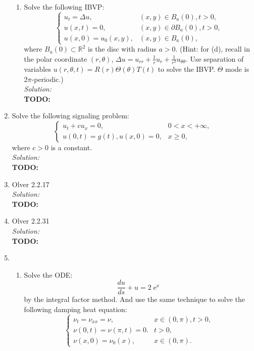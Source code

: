 \documentclass[10pt]{amsart}
\DeclareMathOperator{\E}{e}
\theoremstyle{nonumberplain}
\begin{document}
\begin{enumerate}[label={\bf {\arabic*}:}]
\begin{enumerate}
\item Solve the following IBVP:
$$
\begin{cases}
u_t = \Delta u, &(x, y) \in B_a(0), t> 0, \\
u(x, t) = 0, &(x, y) \in \partial B_a(0), t> 0, \\
u(x, 0) = u_0(x, y), &(x, y) \in B_a(0),
\end{cases}
$$
where $B_a(0) \subset \mathbb R^2$ is the disc with radius $a > 0$.
(Hint: for (d), recall in the polar coordinate $(r, \theta)$, $\Delta u = u_{rr} + \frac 1 r u_r + \frac 1 {r^2} u_{\theta\theta}$.
Use separation of variables $u(r, \theta, t) = R(r)\Theta(\theta)T(t)$ to solve the IBVP.
$\Theta$ mode is 2$\pi$-periodic.) \\

\noindent
\textit{Solution:} \\
\textbf{TODO:} \\

\end{enumerate}

\newpage

\item Solve the following signaling problem: 
$$
\begin{cases}
u_t + cu_x = 0, & 0< x< + \infty, \\
u(0, t) = g(t), u(x, 0) = 0, &x \geq0,
\end{cases}
$$
where $c > 0$ is a constant. \\

\noindent
\textit{Solution:} \\
\textbf{TODO: } \\

\newpage

\item Olver 2.2.17 \\

\noindent
\textit{Solution:} \\
\textbf{TODO: } \\
\newpage


\item Olver 2.2.31 \\

\noindent
\textit{Solution:} \\
\textbf{TODO: } \\
\newpage

\item 
\begin{enumerate}
\item Solve the ODE:
$$
\frac {du}{ds} + u = 2\E^x
$$
by the integral factor method.
And use the same technique to solve the following damping heat equation:
$$
\begin{cases}
\nu_t = \nu_{xx} = \nu, &x\in(0, \pi), t> 0, \\
\nu(0, t) = \nu(\pi, t) = 0. &t > 0, \\
\nu(x, 0) = \nu_0(x), &x \in (0, \pi).
\end{cases}
$$


\end{enumerate}
\end{enumerate}
\end{document}

